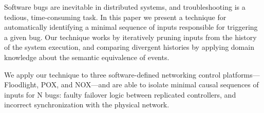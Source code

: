 Software bugs are inevitable in distributed systems, and troubleshooting
is a tedious, time-consuming task.
In this paper we present a technique for automatically identifying
a minimal sequence of inputs responsible for triggering a given bug.
Our technique works by
iteratively pruning inputs from the history of the system execution, and
comparing divergent histories
by applying domain knowledge about the semantic equivalence of events.

We apply our technique to three software-defined networking control
platforms---Floodlight, POX, and NOX---and
are able to isolate minimal causal sequences of inputs for
\num{N} bugs: faulty failover logic between replicated controllers, and incorrect
synchronization with the physical network.
